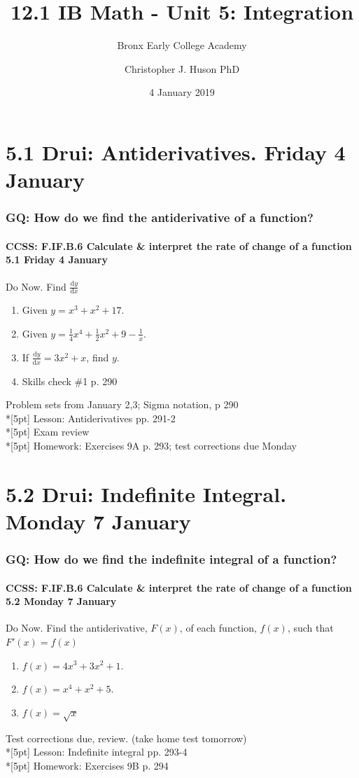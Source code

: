 \documentclass{beamer}
\title{12.1 IB Math - Unit 5: Integration}
\subtitle{Bronx Early College Academy}
\author{Christopher J. Huson PhD}
\date{4 January 2019}
\begin{document}
\frame{\titlepage}

\section[Outline]{}
\frame{\tableofcontents}

\section{5.1 Drui: Antiderivatives. Friday 4 January}
\frame
{
  \frametitle{GQ: How do we find the antiderivative of a function?}
  \framesubtitle{CCSS: F.IF.B.6 Calculate \& interpret the rate of change of a function  \alert{5.1 Friday 4 January}}

  \begin{block}{Do Now. Find $\frac{\mathrm{d}y}{\mathrm{d}x}$}
  \begin{enumerate}
      \item Given $y=x^3+x^2+17$.
      \item Given $y=\frac{1}{4}x^4+\frac{1}{2}x^2+9-\frac{1}{x}$.
      \item If $\displaystyle \frac{\mathrm{d}y}{\mathrm{d}x}=3x^2+x$, find $y$.
      \item Skills check \#1 p. 290
  \end{enumerate}
  \end{block}
  Problem sets from January 2,3; Sigma notation, p 290 \\*[5pt]
  Lesson: Antiderivatives pp. 291-2\\*[5pt]
  Exam review \\*[5pt]
  Homework: Exercises 9A p. 293; test corrections due Monday
}

\section{5.2 Drui: Indefinite Integral. Monday 7 January}
\frame
{
  \frametitle{GQ: How do we find the indefinite integral of a function?}
  \framesubtitle{CCSS: F.IF.B.6 Calculate \& interpret the rate of change of a function  \alert{5.2 Monday 7 January}}

  \begin{block}{Do Now. Find the antiderivative, $F(x)$, of each function, $f(x)$, such that $F'(x)=f(x)$}
  \begin{enumerate}
      \item $f(x)=4x^3+3x^2+1$.
      \item $f(x)=x^4+x^2+5$.
      \item $f(x)= \sqrt{x}$
  \end{enumerate}
  \end{block}
  Test corrections due, review. (take home test tomorrow)\\*[5pt]
  Lesson: Indefinite integral pp. 293-4\\*[5pt]
  Homework: Exercises 9B p. 294
}
\end{document}
